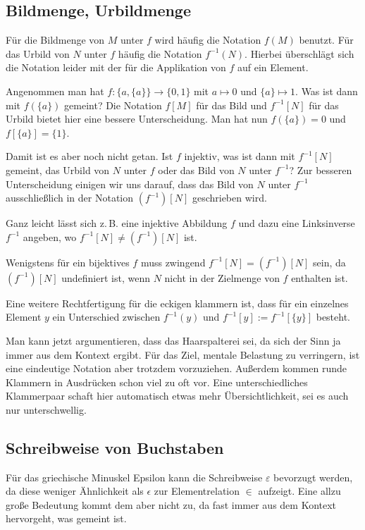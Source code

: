 \documentclass[a4paper,11pt,fleqn,twoside,BCOR=16mm]{scrartcl}
\begin{document}
\subsection{Bildmenge, Urbildmenge}

Für die Bildmenge von $M$ unter $f$ wird häufig die Notation $f(M)$
benutzt. Für das Urbild von $N$ unter $f$ häufig die
Notation $f^{-1}(N)$. Hierbei überschlägt sich die Notation leider mit
der für die Applikation von $f$ auf ein Element.

Angenommen man hat $f\colon \{a,\{a\}\}\to\{0,1\}$ mit $a\mapsto 0$ und
$\{a\}\mapsto 1$. Was ist dann mit $f(\{a\})$ gemeint? Die Notation
$f[M]$ für das Bild und $f^{-1}[N]$ für das Urbild bietet hier eine
bessere Unterscheidung. Man hat nun $f(\{a\})=0$ und
$f[\{a\}]=\{1\}$.

Damit ist es aber noch nicht getan. Ist $f$ injektiv,
was ist dann mit $f^{-1}[N]$ gemeint, das Urbild
von $N$ unter $f$ oder das Bild von $N$ unter $f^{-1}$? Zur besseren
Unterscheidung einigen wir uns darauf, dass das Bild von $N$
unter $f^{-1}$ ausschließlich in der Notation $(f^{-1})[N]$
geschrieben wird.

Ganz leicht lässt sich z.\,B. eine injektive Abbildung $f$ und dazu
eine Linksinverse $f^{-1}$ angeben, wo $f^{-1}[N]\ne (f^{-1})[N]$ ist.

Wenigstens für ein bijektives $f$ muss zwingend
$f^{-1}[N]=(f^{-1})[N]$ sein, da $(f^{-1})[N]$ undefiniert ist,
wenn $N$ nicht in der Zielmenge von $f$ enthalten ist.

Eine weitere Rechtfertigung für die eckigen klammern ist,
dass für ein einzelnes Element $y$ ein Unterschied
zwischen $f^{-1}(y)$ und $f^{-1}[y]:=f^{-1}[\{y\}]$
besteht.

Man kann jetzt argumentieren, dass das Haarspalterei sei,
da sich der Sinn ja immer aus dem Kontext ergibt. Für das Ziel,
mentale Belastung zu verringern, ist eine eindeutige Notation
aber trotzdem vorzuziehen. Außerdem kommen runde Klammern in
Ausdrücken schon viel zu oft vor. Eine unterschiedliches Klammerpaar
schaft hier automatisch etwas mehr Übersichtlichkeit, sei es
auch nur unterschwellig.

\subsection{Schreibweise von Buchstaben}

Für das griechische Minuskel Epsilon kann die Schreibweise
$\varepsilon$ bevorzugt werden, da diese weniger Ähnlichkeit als
$\epsilon$ zur Elementrelation $\in$ aufzeigt. Eine allzu große
Bedeutung kommt dem aber nicht zu, da fast immer aus dem Kontext
hervorgeht, was gemeint ist.
\end{document}
